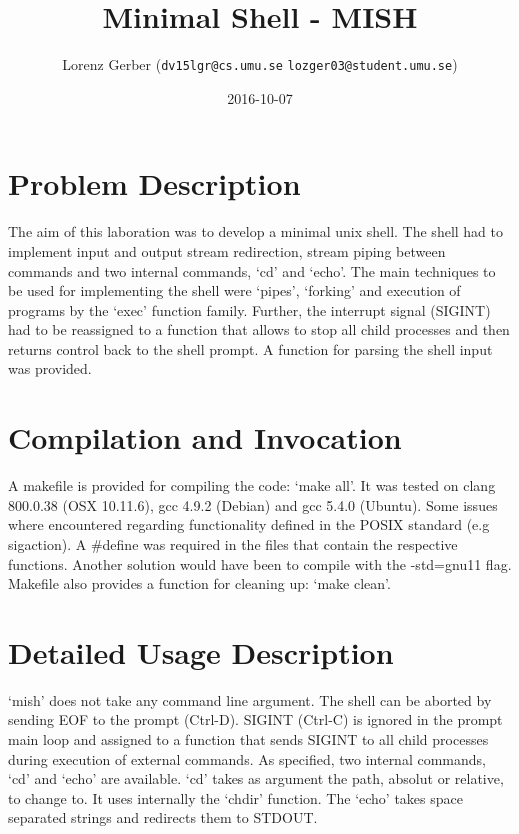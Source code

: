 \documentclass[a4paper,11pt,twoside]{article}
\title{Minimal Shell - MISH}
\author{Lorenz Gerber ({\tt{dv15lgr@cs.umu.se}} {\tt{lozger03@student.umu.se}})}
\date{2016-10-07}
\begin{document}
\lstset{language=C}
\maketitle
\thispagestyle{empty}
\newpage
\tableofcontents
\thispagestyle{empty}
\newpage

\clearpage
{}

\section{Problem Description} 
The aim of this laboration was to develop a minimal unix shell. The shell had to implement input and output stream redirection, stream piping between commands and two internal commands, `cd' and `echo'. The main techniques to be used for implementing the shell were `pipes', `forking' and execution of programs by the `exec' function family. Further, the interrupt signal (SIGINT) had to be reassigned to a function that allows to stop all child processes and then returns control back to the shell prompt. A function for parsing the shell input was provided. 

\section{Compilation and Invocation}
A makefile is provided for compiling the code: `make all'. It was tested on clang 800.0.38 (OSX 10.11.6), gcc 4.9.2 (Debian) and gcc 5.4.0 (Ubuntu). Some issues where encountered regarding functionality defined in the POSIX standard (e.g sigaction). A \#define was required in the files that contain the respective functions. Another solution would have been to compile with the -std=gnu11 flag. Makefile also provides a function for cleaning up: `make clean'.

\section{Detailed Usage Description}
`mish' does not take any command line argument. The shell can be aborted by sending EOF to the prompt (Ctrl-D). SIGINT (Ctrl-C) is ignored in the prompt main loop and assigned to a function that sends SIGINT to all child processes during execution of external commands.
As specified, two internal commands, `cd' and `echo' are available. `cd' takes as argument the path, absolut or relative,  to change to. It uses internally the `chdir' function. The `echo' takes space separated strings and redirects them to STDOUT.
\end{document}
